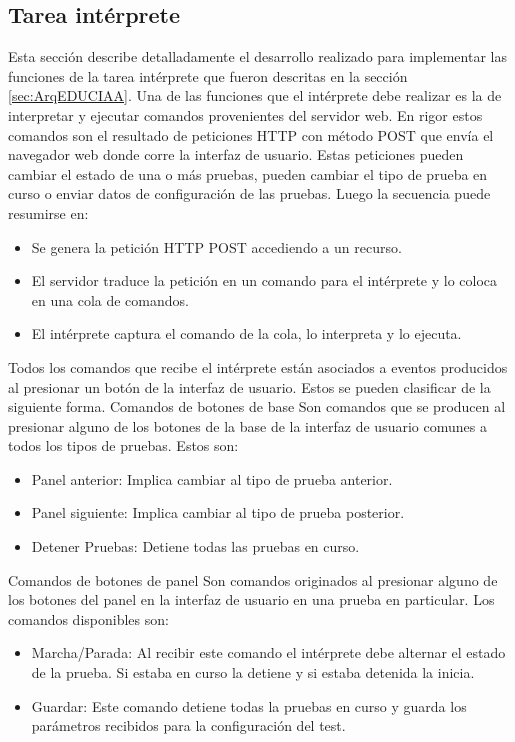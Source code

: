 \subsection{Tarea intérprete}
Esta sección describe detalladamente el desarrollo realizado para implementar las funciones de la tarea intérprete que fueron descritas en la sección \ref{sec:ArqEDUCIAA}.
Una de las funciones que el intérprete debe realizar es la de interpretar y ejecutar comandos provenientes del servidor web. En rigor estos comandos son el resultado de peticiones HTTP con método POST que envía el navegador web donde corre la interfaz de usuario. Estas peticiones pueden cambiar el estado de una o más pruebas, pueden cambiar el tipo de prueba en curso o enviar datos de configuración de las pruebas.
Luego la secuencia puede resumirse en:
\begin{itemize}
	\item Se genera la petición HTTP POST accediendo a un recurso.
	\item El servidor traduce la petición en un comando para el intérprete y lo coloca en una cola de comandos.
	\item El intérprete captura el comando de la cola, lo interpreta y lo ejecuta.
\end{itemize}

Todos los comandos que recibe el intérprete están asociados a eventos producidos al presionar un botón de la interfaz de usuario. Estos se pueden clasificar de la siguiente forma.
Comandos de botones de base
Son comandos que se producen al presionar alguno de los botones de la base de la interfaz de usuario comunes a todos los tipos de pruebas. Estos son:
\begin{itemize}
	\item Panel anterior: Implica cambiar al tipo de prueba anterior.
	\item Panel siguiente: Implica cambiar al tipo de prueba posterior.
	\item Detener Pruebas: Detiene todas las pruebas en curso.
\end{itemize}
Comandos de botones de panel
Son comandos originados al presionar alguno de los botones del panel en la interfaz de usuario en una prueba en particular. Los comandos disponibles son:
\begin{itemize}
	\item Marcha/Parada: Al recibir este comando el intérprete debe alternar el estado de la prueba. Si estaba en curso la detiene y si estaba detenida la inicia.
	\item Guardar: Este comando detiene todas la pruebas en curso y guarda los parámetros recibidos para la configuración del test.	
\end{itemize}

